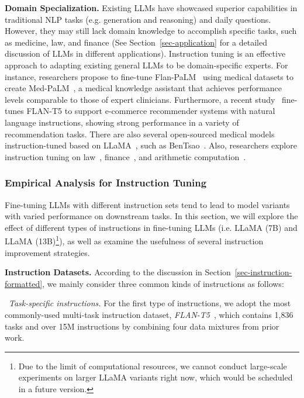 \textbf{Domain Specialization.} Existing LLMs have showcased superior capabilities in traditional NLP tasks (e.g. generation and reasoning) and daily questions.  However, they may still lack domain knowledge to accomplish specific tasks, such as medicine, law, and finance (See Section~\ref{sec-application} for a detailed discussion of LLMs in different applications). Instruction tuning is an effective approach to adapting existing general LLMs to be domain-specific experts. For instance, researchers propose to fine-tune Flan-PaLM~\cite{Chung-arxiv-2022-Scaling} using medical datasets to create Med-PaLM~\cite{singhal-arxiv-2022-large}, a medical knowledge assistant that achieves performance levels comparable to those of expert clinicians. Furthermore, a recent study~\cite{Zhang-2023-arxiv-recommendation} fine-tunes FLAN-T5 to support e-commerce recommender systems with natural language instructions, showing strong performance in a variety of recommendation tasks. There are also several open-sourced medical models instruction-tuned based on LLaMA~\cite{Touvron-arxiv-2023-LLaMA}, such as  BenTsao~\cite{wang-arxiv-2023-huatuo}. Also, researchers  explore instruction tuning on law~\cite{huang-arxiv-2023-lawyer}, finance~\cite{wu-arxiv-2023-bloomberggpt}, and arithmetic computation~\cite{liu-arxiv-2023-goat}. 

\subsubsection{Empirical Analysis for Instruction Tuning} \label{instruction-results}

Fine-tuning LLMs with different instruction sets tend to  lead to model  variants with varied performance on downstream tasks.  In this section, we will explore the effect of different types of instructions in  fine-tuning LLMs (i.e. LLaMA (7B) and LLaMA (13B)\footnote{Due to the limit of computational resources, we cannot conduct large-scale experiments on larger LLaMA variants right now, which would be scheduled in a future version.}), as well as examine the usefulness of several instruction improvement strategies.

\textbf{Instruction Datasets.} According to the discussion in  Section~\ref{sec-instruction-formatted}, we mainly consider three common kinds of instructions as follows: 

\textbullet~\emph{Task-specific instructions.} For the first type of   instructions, we adopt the most commonly-used multi-task  instruction dataset, \emph{FLAN-T5}~\cite{Chung-arxiv-2022-Scaling}, which contains 1,836 tasks and over 15M instructions by combining four data mixtures from prior work.

